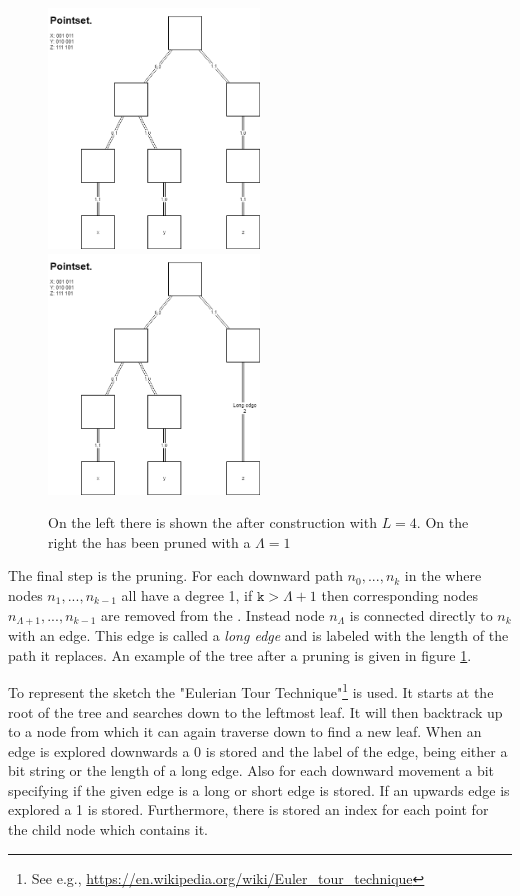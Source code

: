\begin{figure}
	\includegraphics[width=0.5\textwidth]{figures/quadtree}
	\includegraphics[width=0.5\textwidth]{figures/prunnedquadtree}
	\caption{On the left there is shown the \qt{} after construction with $L=4$. On the right the \qt{} has been pruned with a $\Lambda = 1$}
	\label{fig:quadtree}
\end{figure}

The final step is the pruning. For each downward path $n_0,...,n_k$ in the \qt{} where nodes $n_1,...,n_{k-1}$ all have a degree 1, if \ensuremath{\texttt{k} > \Lambda+1} then corresponding nodes $n_{\Lambda+1},...,n_{k-1}$ are removed from the \qt{}. Instead node $n_{\Lambda}$ is connected directly to $n_{k}$ with an edge. This edge is called a \textit{long edge} and is labeled with the length of the path it replaces. An example of the tree after a pruning is given in figure \ref{fig:quadtree}.


To represent the sketch the "Eulerian Tour Technique"\footnote{See e.g., \url{https://en.wikipedia.org/wiki/Euler\_tour\_technique}} is used.
It starts at the root of the tree and searches down to the leftmost leaf. It will then backtrack up to a node from which it can again traverse down to find a new leaf. When an edge is explored downwards a 0 is stored and the label of the edge, being either a bit string or the length of a long edge. Also for each downward movement a bit specifying if the given edge is a long or short edge is stored. If an upwards edge is explored a 1 is stored. Furthermore, there is stored an index for each point for the child node which contains it.

